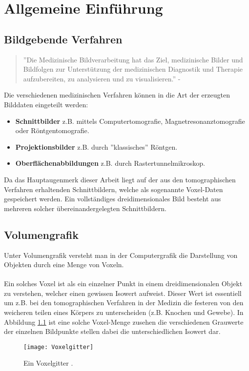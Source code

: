 \chapter{Allgemeine Einführung}

\section{Bildgebende Verfahren}
\begin{quote}
	''Die Medizinische Bildverarbeitung hat das Ziel, medizinische Bilder und Bildfolgen zur Unterstützung der medizinischen Diagnostik und Therapie aufzubereiten, zu analysieren und zu visualisieren.'' - \citep{MedBildVerarbeitung}
\end{quote}
Die verschiedenen medizinischen Verfahren können in die Art der erzeugten Bilddaten eingeteilt werden:
\begin{itemize}
	\item \textbf{Schnittbilder} z.B. mittels Computertomografie, Magnetresonanztomografie oder Röntgentomografie.
	\item \textbf{Projektionsbilder} z.B. durch ''klassisches'' Röntgen.
	\item \textbf{Oberflächenabbildungen} z.B. durch Rastertunnelmikroskop.
\end{itemize}
Da das Hauptaugenmerk dieser Arbeit liegt auf der aus den tomographischen Verfahren erhaltenden Schnittbildern, welche als sogenannte Voxel-Daten gespeichert werden. Ein vollständiges dreidimensionales Bild besteht aus mehreren solcher übereinandergelegten Schnittbildern.

\section{Volumengrafik}
Unter Volumengrafik versteht man in der Computergrafik die Darstellung von Objekten durch eine Menge von Voxeln. 
\\\\
Ein solches Voxel ist als ein einzelner Punkt in einem dreidimensionalen Objekt zu verstehen, welcher einen gewissen Isowert aufweist. Dieser Wert ist essentiell um z.B. bei den tomographischen Verfahren in der Medizin die festeren von den weicheren teilen eines Körpers zu unterscheiden (z.B. Knochen und Gewebe). In Abbildung \ref{fig:Voxelgitter} ist eine solche Voxel-Menge zusehen die verschiedenen Grauwerte der einzelnen Bildpunkte stellen dabei die unterschiedlichen Isowert dar.

\begin{figure}
	\centering
	\texttt{[image: Voxelgitter]}
	\caption{Ein Voxelgitter \citep{SeibtBak}.}
	\label{fig:Voxelgitter}
\end{figure}

